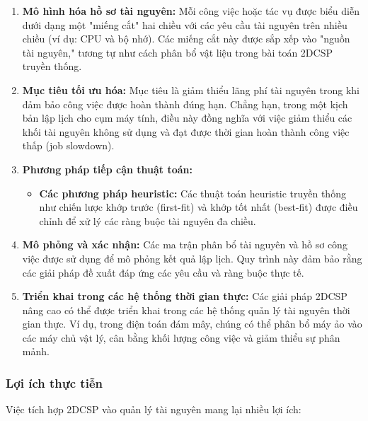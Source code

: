\begin{enumerate}
    \item \textbf{Mô hình hóa hồ sơ tài nguyên: } 
    Mỗi công việc hoặc tác vụ được biểu diễn dưới dạng một "miếng cắt" hai chiều với các yêu cầu tài nguyên trên nhiều chiều (ví dụ: CPU và bộ nhớ). Các miếng cắt này được sắp xếp vào "nguồn tài nguyên," tương tự như cách phân bổ vật liệu trong bài toán 2DCSP truyền thống.  

    \item \textbf{Mục tiêu tối ưu hóa:} 
    Mục tiêu là giảm thiểu lãng phí tài nguyên trong khi đảm bảo công việc được hoàn thành đúng hạn. Chẳng hạn, trong một kịch bản lập lịch cho cụm máy tính, điều này đồng nghĩa với việc giảm thiểu các khối tài nguyên không sử dụng và đạt được thời gian hoàn thành công việc thấp (job slowdown).  

    \item \textbf{Phương pháp tiếp cận thuật toán: }
    \begin{itemize}
        \item \textbf{Các phương pháp heuristic:} Các thuật toán heuristic truyền thống như chiến lược khớp trước (first-fit) và khớp tốt nhất (best-fit) được điều chỉnh để xử lý các ràng buộc tài nguyên đa chiều.
    \end{itemize}  

    \item \textbf{Mô phỏng và xác nhận:}  
    Các ma trận phân bổ tài nguyên và hồ sơ công việc được sử dụng để mô phỏng kết quả lập lịch. Quy trình này đảm bảo rằng các giải pháp đề xuất đáp ứng các yêu cầu và ràng buộc thực tế.  

    \item \textbf{Triển khai trong các hệ thống thời gian thực:  }
    Các giải pháp 2DCSP nâng cao có thể được triển khai trong các hệ thống quản lý tài nguyên thời gian thực. Ví dụ, trong điện toán đám mây, chúng có thể phân bổ máy ảo vào các máy chủ vật lý, cân bằng khối lượng công việc và giảm thiểu sự phân mảnh.  
\end{enumerate}  

\subsubsection{Lợi ích thực tiễn}  
\hspace{0.5cm}Việc tích hợp 2DCSP vào quản lý tài nguyên mang lại nhiều lợi ích:  

